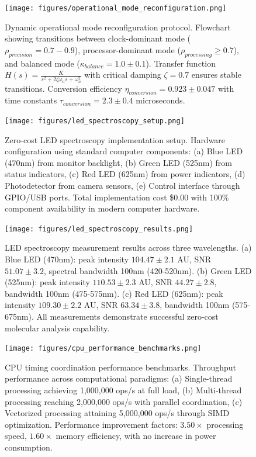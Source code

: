 \begin{figure}[H]
\centering
\texttt{[image: figures/operational\_mode\_reconfiguration.png]}
\caption{Dynamic operational mode reconfiguration protocol. Flowchart showing transitions between clock-dominant mode ($\rho_{precision} = 0.7-0.9$), processor-dominant mode ($\rho_{processing} \geq 0.7$), and balanced mode ($\kappa_{balance} = 1.0 \pm 0.1$). Transfer function $H(s) = \frac{K}{s^2 + 2\zeta\omega_n s + \omega_n^2}$ with critical damping $\zeta = 0.7$ ensures stable transitions. Conversion efficiency $\eta_{conversion} = 0.923 \pm 0.047$ with time constants $\tau_{conversion} = 2.3 \pm 0.4$ microseconds.}
\label{fig:mode_reconfiguration}
\end{figure}


\begin{figure}[H]
\centering
\texttt{[image: figures/led\_spectroscopy\_setup.png]}
\caption{Zero-cost LED spectroscopy implementation setup. Hardware configuration using standard computer components: (a) Blue LED (470nm) from monitor backlight, (b) Green LED (525nm) from status indicators, (c) Red LED (625nm) from power indicators, (d) Photodetector from camera sensors, (e) Control interface through GPIO/USB ports. Total implementation cost \$0.00 with 100\% component availability in modern computer hardware.}
\label{fig:led_spectroscopy_setup}
\end{figure}

\begin{figure}[H]
\centering
\texttt{[image: figures/led\_spectroscopy\_results.png]}
\caption{LED spectroscopy measurement results across three wavelengths. (a) Blue LED (470nm): peak intensity $104.47 \pm 2.1$ AU, SNR $51.07 \pm 3.2$, spectral bandwidth 100nm (420-520nm). (b) Green LED (525nm): peak intensity $110.53 \pm 2.3$ AU, SNR $44.27 \pm 2.8$, bandwidth 100nm (475-575nm). (c) Red LED (625nm): peak intensity $109.30 \pm 2.2$ AU, SNR $63.34 \pm 3.8$, bandwidth 100nm (575-675nm). All measurements demonstrate successful zero-cost molecular analysis capability.}
\label{fig:led_results}
\end{figure}

\begin{figure}[H]
\centering
\texttt{[image: figures/cpu\_performance\_benchmarks.png]}
\caption{CPU timing coordination performance benchmarks. Throughput performance across computational paradigms: (a) Single-thread processing achieving 1,000,000 ops/s at full load, (b) Multi-thread processing reaching 2,000,000 ops/s with parallel coordination, (c) Vectorized processing attaining 5,000,000 ops/s through SIMD optimization. Performance improvement factors: $3.50 \times$ processing speed, $1.60 \times$ memory efficiency, with no increase in power consumption.}
\label{fig:cpu_benchmarks}
\end{figure}


